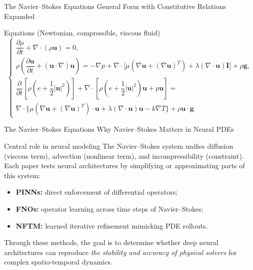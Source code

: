 \begin{frame}{The Navier--Stokes Equations}
\small
\textcolor{red_unipd}{\Large General Form with Constitutive Relations Expanded}

\vspace{0.6em}

\begin{alertblock}{Equations (Newtonian, compressible, viscous fluid)}
\[
\begin{cases}
\dfrac{\partial \rho}{\partial t}
+ \nabla\!\cdot\!(\rho \mathbf{u}) = 0,\\[16pt]

\rho\!\left(
\dfrac{\partial \mathbf{u}}{\partial t}
+ (\mathbf{u}\!\cdot\!\nabla)\mathbf{u}
\right)
= -\nabla p
+ \nabla\!\cdot\!\Big[
\mu\!\left(\nabla \mathbf{u} + (\nabla \mathbf{u})^T\right)
+ \lambda (\nabla\!\cdot\!\mathbf{u})\mathbf{I}
\Big]
+ \rho \mathbf{g},\\[20pt]

\dfrac{\partial }{\partial t}\!
\left[\rho\!\left(e + \dfrac{1}{2}|\mathbf{u}|^2\right)\right]
+ \nabla\!\cdot\!
\left[\rho\!\left(e + \dfrac{1}{2}|\mathbf{u}|^2\right)\mathbf{u} + p\mathbf{u}\right]
= \\ \nabla\!\cdot\!
\Big\{
\mu\!\left(\nabla \mathbf{u} + (\nabla \mathbf{u})^T\right)\!\cdot\!\mathbf{u}
+ \lambda (\nabla\!\cdot\!\mathbf{u})\mathbf{u}
- k\nabla T
\Big\}
+ \rho \mathbf{u}\!\cdot\!\mathbf{g}
\end{cases}
\]
\end{alertblock}

\end{frame}




\begin{frame}{The Navier--Stokes Equations}
\small
\textcolor{red_unipd}{\Large Why Navier--Stokes Matters in Neural PDEs}

\vspace{0.6em}

\begin{block}{Central role in neural modeling}
The Navier--Stokes system unifies diffusion (viscous term),  
advection (nonlinear term), and incompressibility (constraint).  
Each paper tests neural architectures by simplifying or approximating parts of this system:
\begin{itemize}
  \item \textbf{PINNs:} direct enforcement of differential operators;
  \item \textbf{FNOs:} operator learning across time steps of Navier–Stokes;
  \item \textbf{NFTM:} learned iterative refinement mimicking PDE rollouts.
\end{itemize}
\vspace{0.4em}
Through these methods, the goal is to determine whether deep neural architectures can reproduce  
\textit{the stability and accuracy of physical solvers} for complex spatio-temporal dynamics.
\end{block}
\end{frame}
